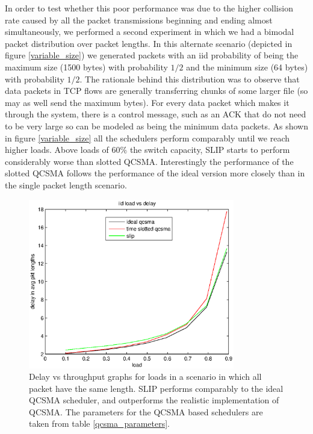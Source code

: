 \documentclass[11pt]{article}%
\begin{document}
In order to test whether this poor performance was due to the higher collision rate caused by all the packet transmissions beginning and ending almost simultaneously, we performed a second experiment in which we had a bimodal packet distribution over packet lengths.  In this alternate scenario (depicted in figure \ref{variable_size}) we generated packets with an iid probability of being the maximum size (1500 bytes) with probability $1/2$ and the minimum size (64 bytes) with probability $1/2$.  The rationale behind this distribution was to observe that data packets in TCP flows are generally transferring chunks of some larger file (so may as well send the maximum bytes).  For every data packet which makes it through the system, there is a control message, such as an ACK that do not need to be very large so can be modeled as being the minimum data packets.  As shown in figure \ref{variable_size} all the schedulers perform comparably until we reach higher loads.  Above loads of $60\%$ the switch capacity, SLIP starts to perform considerably worse than slotted QCSMA.  Interestingly the performance of the slotted QCSMA follows the performance of the ideal version more closely than in the single packet length scenario.

\begin{figure}
\center
	 \includegraphics[width=90mm]{us_load.eps}
	\caption{Delay vs throughput graphs for loads in a scenario in which all packet have the same length.  SLIP performs comparably to the ideal QCSMA scheduler, and outperforms the realistic implementation of QCSMA.  The parameters for the QCSMA based schedulers are taken from table \ref{qcsma_parameters}.} 	
	\label{one_size}
\end{figure}
\end{document}

